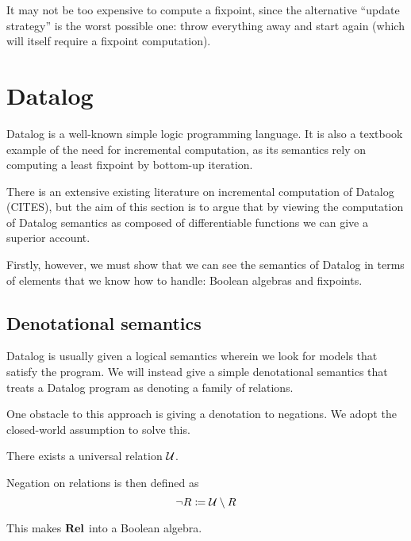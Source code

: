 It may not be too expensive to compute a fixpoint, since the alternative
``update strategy'' is the worst possible one: throw everything away and start
again (which will itself require a fixpoint computation).

\section{Datalog}
\label{sec:datalog}

Datalog is a well-known simple logic programming language. It is also a textbook
example of the need for incremental computation, as its semantics rely on
computing a least fixpoint by bottom-up iteration.

There is an extensive existing literature on incremental computation of Datalog
(CITES), but the aim of this section is to argue that by viewing the computation
of Datalog semantics as composed of differentiable functions we can give a
superior account.

Firstly, however, we must show that we can see the semantics of Datalog in terms
of elements that we know how to handle: Boolean algebras and fixpoints.

\subsection{Denotational semantics}

Datalog is usually given a logical semantics wherein we look for models that
satisfy the program. We will instead give a simple denotational semantics that treats a Datalog
program as denoting a family of relations.

One obstacle to this approach is giving a denotation to negations. We adopt the
closed-world assumption to solve this.

\begin{defn}
  There exists a universal relation $\mathcal{U}$.
  
  Negation on relations is then defined as $$\neg R \coloneqq \mathcal{U} \setminus R$$
\end{defn}

This makes $\mathbf{Rel}$ into a Boolean algebra.


